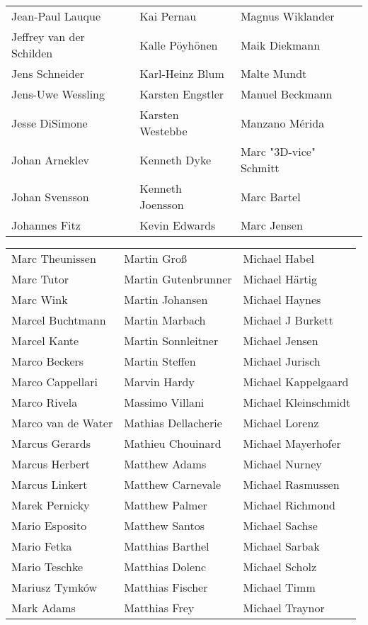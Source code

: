 \begin{tabular}{p{4.5cm}p{4.5cm}p{4.5cm}}
Jean-Paul Lauque & Kai Pernau & Magnus Wiklander \\
Jeffrey van der Schilden & Kalle Pöyhönen & Maik Diekmann \\
Jens Schneider & Karl-Heinz Blum & Malte Mundt \\
Jens-Uwe Wessling & Karsten Engstler & Manuel Beckmann \\
Jesse DiSimone & Karsten Westebbe & Manzano Mérida \\
Johan Arneklev & Kenneth Dyke & Marc "3D-vice" Schmitt \\
Johan Svensson & Kenneth Joensson & Marc Bartel \\
Johannes Fitz & Kevin Edwards & Marc Jensen \\
\end{tabular}
\newpage
\setlength{\tabcolsep}{1mm}
\begin{tabular}{p{4.5cm}p{4.5cm}p{4.5cm}}
Marc Theunissen & Martin Groß & Michael Habel \\
Marc Tutor & Martin Gutenbrunner & Michael Härtig \\
Marc Wink & Martin Johansen & Michael Haynes \\
Marcel Buchtmann & Martin Marbach & Michael J Burkett \\
Marcel Kante & Martin Sonnleitner & Michael Jensen \\
Marco Beckers & Martin Steffen & Michael Jurisch \\
Marco Cappellari & Marvin Hardy & Michael Kappelgaard \\
Marco Rivela & Massimo Villani & Michael Kleinschmidt \\
Marco van de Water & Mathias Dellacherie & Michael Lorenz \\
Marcus Gerards & Mathieu Chouinard & Michael Mayerhofer \\
Marcus Herbert & Matthew Adams & Michael Nurney \\
Marcus Linkert & Matthew Carnevale & Michael Rasmussen \\
Marek Pernicky & Matthew Palmer & Michael Richmond \\
Mario Esposito & Matthew Santos & Michael Sachse \\
Mario Fetka & Matthias Barthel & Michael Sarbak \\
Mario Teschke & Matthias Dolenc & Michael Scholz \\
Mariusz Tymków & Matthias Fischer & Michael Timm \\
Mark Adams & Matthias Frey & Michael Traynor \\

\end{tabular}
